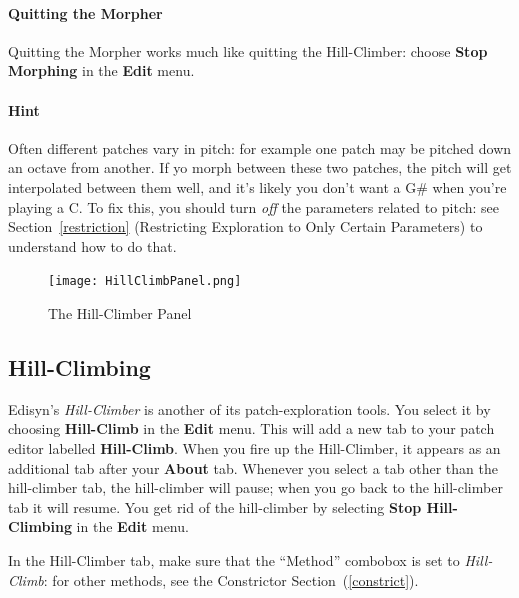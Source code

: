\documentclass{article}
\newcommand\bump{\vspace{12in}}
\begin{document}
\paragraph{Quitting the Morpher} Quitting the Morpher works much like quitting the Hill-Climber: choose {\bf  Stop Morphing} in the {\bf Edit} menu.

\paragraph{\color{red}Hint} Often different patches vary in pitch: for example one patch may be pitched down an octave from another.  If yo morph between these two patches, the pitch will get interpolated between them well, and it's likely you don't want a G\# when you're playing a C.  To fix this, you should turn {\it off} the parameters related to pitch: see Section~\ref{restriction} (Restricting Exploration to Only Certain Parameters) to understand how to do that.



\bump

\begin{figure}
\vspace{-2em}\texttt{[image: HillClimbPanel.png]}
\vspace{-3em}
\caption{The Hill-Climber Panel}
\vspace{-2em}
\label{hcpanel}
\end{figure}

\subsection{Hill-Climbing}
\label{hillclimb}

Edisyn's {\it Hill-Climber} is another of its patch-exploration tools.  You select it by choosing {\bf Hill-Climb} in the {\bf Edit} menu.  This will add a new tab to your patch editor labelled {\bf Hill-Climb}.   When you fire up the Hill-Climber, it appears as an additional tab after your {\bf About} tab.  Whenever you select a tab other than the hill-climber tab, the hill-climber will pause; when you go back to the hill-climber tab it will resume.  You get rid of the hill-climber by selecting {\bf Stop Hill-Climbing} in the {\bf Edit} menu. 

In the Hill-Climber tab, make sure that the ``Method'' combobox is set to {\it Hill-Climb}: for other methods, see the Constrictor Section~(\ref{constrict}).
\end{document}

